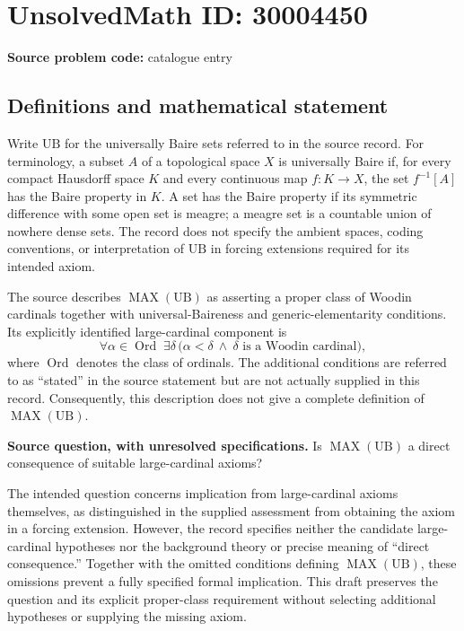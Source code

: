 \documentclass[11pt]{article}
\begin{document}
\section*{UnsolvedMath ID: 30004450}
\textbf{Source problem code:} catalogue entry
\subsection{Definitions and mathematical statement}
Write \(\mathrm{UB}\) for the universally Baire sets referred to in the source record. For terminology, a subset \(A\) of a topological space \(X\) is universally Baire if, for every compact Hausdorff space \(K\) and every continuous map \(f:K\to X\), the set \(f^{-1}[A]\) has the Baire property in \(K\). A set has the Baire property if its symmetric difference with some open set is meagre; a meagre set is a countable union of nowhere dense sets. The record does not specify the ambient spaces, coding conventions, or interpretation of \(\mathrm{UB}\) in forcing extensions required for its intended axiom.

The source describes \(\operatorname{MAX}(\mathrm{UB})\) as asserting a proper class of Woodin cardinals together with universal-Baireness and generic-elementarity conditions. Its explicitly identified large-cardinal component is
\[
\forall\alpha\in\operatorname{Ord}\;\exists\delta\,
\bigl(\alpha<\delta\ \land\ \delta\text{ is a Woodin cardinal}\bigr),
\]
where \(\operatorname{Ord}\) denotes the class of ordinals. The additional conditions are referred to as ``stated'' in the source statement but are not actually supplied in this record. Consequently, this description does not give a complete definition of \(\operatorname{MAX}(\mathrm{UB})\).

\textbf{Source question, with unresolved specifications.} Is \(\operatorname{MAX}(\mathrm{UB})\) a direct consequence of suitable large-cardinal axioms?

The intended question concerns implication from large-cardinal axioms themselves, as distinguished in the supplied assessment from obtaining the axiom in a forcing extension. However, the record specifies neither the candidate large-cardinal hypotheses nor the background theory or precise meaning of ``direct consequence.'' Together with the omitted conditions defining \(\operatorname{MAX}(\mathrm{UB})\), these omissions prevent a fully specified formal implication. This draft preserves the question and its explicit proper-class requirement without selecting additional hypotheses or supplying the missing axiom.
\end{document}

